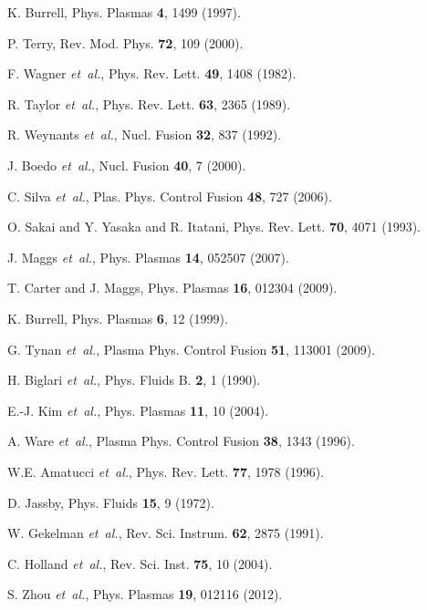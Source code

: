 \documentclass[aps,prl,amsmath,amssymb,preprint,superscriptaddress]{revtex4} %
\begin{document}
\providecommand{\noopsort}[1]{}\providecommand{\singleletter}[1]{#1}%
\begin{thebibliography}{10}

K. Burrell, Phys. Plasmas {\bf 4},  1499  (1997).

P. Terry, Rev. Mod. Phys. {\bf 72},  109  (2000).

F. Wagner {\it et~al.}, Phys. Rev. Lett. {\bf 49},  1408  (1982).

R. Taylor {\it et~al.}, Phys. Rev. Lett. {\bf 63},  2365  (1989).

R. Weynants {\it et~al.}, Nucl. Fusion {\bf 32},  837  (1992).

J. Boedo {\it et~al.}, Nucl. Fusion {\bf 40},  7  (2000).

C. Silva {\it et~al.}, Plas. Phys. Control Fusion {\bf 48},  727  (2006).

O. Sakai and Y. Yasaka and R. Itatani, Phys. Rev. Lett. {\bf 70},  4071 (1993).

J. Maggs {\it et~al.}, Phys. Plasmas {\bf 14},  052507  (2007).

T. Carter and J. Maggs, Phys. Plasmas {\bf 16},  012304  (2009).

K. Burrell, Phys. Plasmas {\bf 6},  12  (1999).

G. Tynan {\it et~al.}, Plasma Phys. Control Fusion {\bf 51}, 113001  (2009).

H. Biglari {\it et~al.}, Phys. Fluids B. {\bf 2},  1  (1990).

E.-J. Kim {\it et~al.}, Phys. Plasmas {\bf 11},  10  (2004).

A. Ware {\it et~al.}, Plasma Phys. Control Fusion
  {\bf 38},  1343  (1996).

W.E. Amatucci {\it et~al.}, Phys. Rev. Lett. {\bf 77},  1978  (1996).

D. Jassby, Phys. Fluids {\bf 15},  9  (1972).

W. Gekelman {\it et~al.}, Rev. Sci. Instrum. {\bf 62},  2875  (1991).

C. Holland {\it et~al.}, Rev. Sci. Inst. {\bf 75},  10
  (2004).

S. Zhou {\it et~al.}, Phys. Plasmas {\bf 19},  012116  (2012).


\end{thebibliography}
\end{document}
